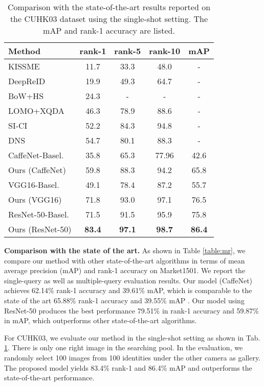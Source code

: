 \documentclass[journal]{IEEEtran}
\begin{document}
\begin{table}
\begin{center}
\begin{tabular}{l|c|c|c|c}
\hline
Method & rank-1 & rank-5 & rank-10 & mAP\\
\hline
KISSME \cite{kostinger2012large} & 11.7 & 33.3 & 48.0 & -\\
DeepReID \cite{li2014deepreid} & 19.9 & 49.3 & 64.7 & -\\ 
BoW+HS \cite{zheng2015scalable} & 24.3 & - & - & -\\
LOMO+XQDA \cite{liao2015person} & 46.3 & 78.9 & 88.6 &-\\
SI-CI \cite{wang2016joint} & 52.2 & 84.3 & 94.8 &-\\
DNS \cite{zhang2016learning} & 54.7 & 80.1 & 88.3 &-\\
\hline\hline
CaffeNet-Basel. & 35.8 & 65.3 & 77.96 & 42.6 \\
Ours (CaffeNet) & 59.8 & 88.3 & 94.2 & 65.8\\
\hline
VGG16-Basel. & 49.1 & 78.4 & 87.2 & 55.7 \\
Ours (VGG16) & 71.8 & 93.0 & 97.1 & 76.5 \\
\hline
ResNet-50-Basel. & 71.5 & 91.5 & 95.9 & 75.8 \\
Ours (ResNet-50) & \textbf{83.4} & \textbf{97.1} & \textbf{98.7} & \textbf{86.4}\\
\hline
\end{tabular}
\end{center}
\caption{Comparison with the state-of-the-art results reported on the CUHK03 dataset using the single-shot setting. The mAP and rank-1 accuracy are listed.}
\label{table:single}
\end{table}
\textbf{Comparison with the state of the art.} 
As shown in Table \ref{table:mr}, we compare our method with other state-of-the-art algorithms in terms of mean average precision (mAP) and rank-1 accuracy on Market1501. We report the single-query as well as multiple-query evaluation results. Our model (CaffeNet) achieves 62.14\% rank-1 accuracy and 39.61\% mAP, which is comparable to the state of the art 65.88\% rank-1 accuracy and 39.55\% mAP \cite{varior2016gated}. Our model using ResNet-50 produces the best performance 79.51\% in rank-1 accuracy and 59.87\% in mAP, which outperforms other state-of-the-art algorithms.

For CUHK03, we evaluate our method in the single-shot setting as shown in Tab. \ref{table:single}. There is only one right image in the searching pool. In the evaluation, we randomly select 100 images from 100 identities under the other camera as gallery. The proposed model yields 83.4\% rank-1 and 86.4\% mAP and outperforms the state-of-the-art performance.
\end{document}
